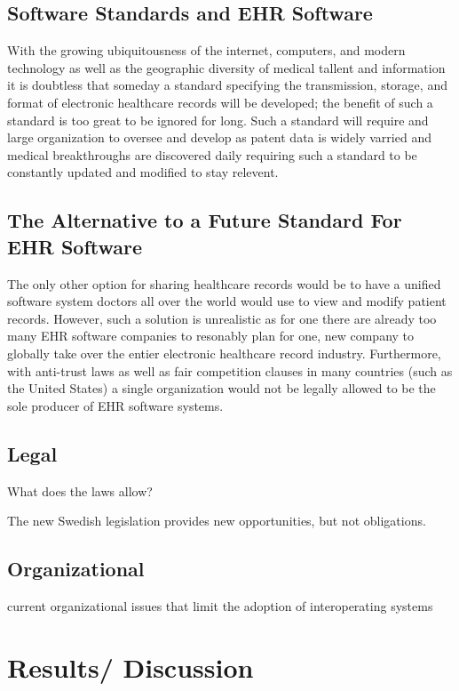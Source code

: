 \documentclass[12pt]{article}
\begin{document}
\subsection{Software Standards and EHR Software}
With the growing ubiquitousness of the internet, computers, and modern technology as well as the geographic diversity of medical tallent and information it is doubtless that someday a standard specifying the transmission, storage, and format of electronic healthcare records will be developed; the benefit of such a standard is too great to be ignored for long. Such a standard will require and large organization to oversee and develop as patent data is widely varried and medical breakthroughs are discovered daily requiring such a standard to be constantly updated and modified to stay relevent. 

\subsection{The Alternative to a Future Standard For EHR Software}
The only other option for sharing healthcare records would be to have a unified software system doctors all over the world would use to view and modify patient records. However, such a solution is unrealistic as for one there are already too many EHR software companies to resonably plan for one, new company to globally take over the entier electronic healthcare record industry. Furthermore, with anti-trust laws as well as fair competition clauses in many countries (such as the United States) a single organization would not be legally allowed to be the sole producer of EHR software systems.



\subsection{Legal}
What does the laws allow? 

The new Swedish legislation provides new opportunities, but not obligations. \cite{RiR19}

\subsection{Organizational}
current organizational issues that limit the adoption of interoperating systems


\section{Results/ Discussion}
\end{document}
